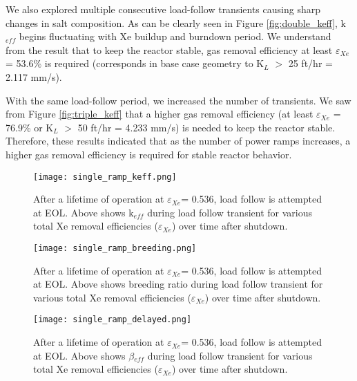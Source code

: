     We also explored multiple consecutive load-follow transients causing sharp changes in salt composition. As can be clearly seen in Figure \ref{fig:double_keff}, k$_{eff}$ begins fluctuating with Xe buildup and burndown period. We understand from the result that to keep the reactor stable, gas removal efficiency at least $\varepsilon$$_{Xe}$ = 53.6\% is required (corresponds in base case geometry to K$_{L}$ $>$ 25 ft/hr = 2.117 mm/s).

    With the same load-follow period, we increased the number of transients. We saw from Figure \ref{fig:triple_keff} that a higher gas removal efficiency (at least $\varepsilon$$_{Xe}$ = 76.9\% or K$_{L}$ $>$ 50 ft/hr = 4.233 mm/s) is needed to keep the reactor stable. Therefore, these results indicated that as the number of power ramps increases, a higher gas removal efficiency is required for stable reactor behavior.

    \begin{figure}[htbp!]
        \begin{center}
            \texttt{[image: single\_ramp\_keff.png]}
        \end{center}
        \caption{After a lifetime of operation at $\varepsilon$$_{Xe}$= 0.536, load follow is attempted at EOL. Above shows k$_{eff}$ during load follow transient for various total Xe removal efficiencies
        ($\varepsilon$$_{Xe}$) over time after shutdown.}
        \label{fig:single_keff}
    \end{figure}

    \begin{figure}[htbp!]
        \begin{center}
            \texttt{[image: single\_ramp\_breeding.png]}
        \end{center}
        \caption{After a lifetime of operation at $\varepsilon$$_{Xe}$= 0.536, load follow is attempted at EOL. Above shows breeding ratio during load
        follow transient for various total Xe removal efficiencies
        ($\varepsilon$$_{Xe}$) over time after shutdown.}
        \label{fig:single_breed}
    \end{figure}

    \begin{figure}[htbp!]
        \begin{center}
            \texttt{[image: single\_ramp\_delayed.png]}
        \end{center}
        \caption{After a lifetime of operation at $\varepsilon$$_{Xe}$= 0.536, load follow is attempted at EOL. Above shows $\beta$$_{eff}$ during load
        follow transient for various total Xe removal efficiencies
        ($\varepsilon$$_{Xe}$) over time after shutdown.}
        \label{fig:single_delayed}
    \end{figure}

